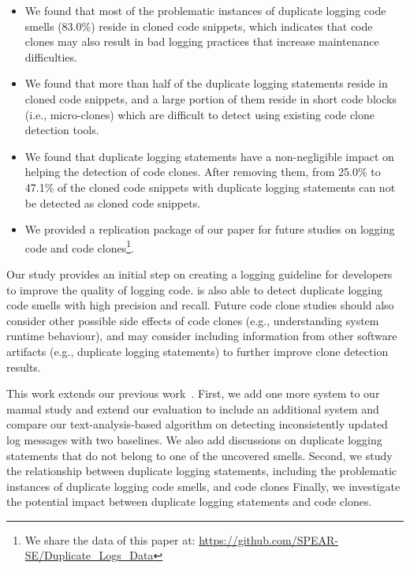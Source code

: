 \begin{itemize}
  \item We found that most of the problematic instances of duplicate logging code smells (83.0\%) reside in cloned code snippets, which indicates that code clones may also result in bad logging practices that increase maintenance difficulties.

  \item We found that more than half of the duplicate logging statements reside in cloned code snippets, and a large portion of them reside in short code blocks (i.e., micro-clones) which are difficult to detect using existing code clone detection tools.


  \item We found that duplicate logging statements have a non-negligible impact on helping the detection of code clones. After removing them, from 25.0\% to 47.1\% of the cloned code snippets with duplicate logging statements can not be detected as cloned code snippets. 

  \item We provided a replication package of our paper for future studies on logging code and code clones\footnote{We share the data of this paper at: \url{https://github.com/SPEAR-SE/Duplicate_Logs_Data}}.




\end{itemize}

Our study provides an initial step on creating a logging guideline for developers to improve the quality of logging code. \toolS is also able to detect duplicate logging code smells with high precision and recall. Future code clone studies should also consider other possible side effects of code clones (e.g., understanding system runtime behaviour), and may consider including information from other software artifacts (e.g., duplicate logging statements) to further improve clone detection results.


This work extends our previous work~\cite{DLFinder}. First, we add one more system to our manual study and extend our evaluation to include an additional system and compare our text-analysis-based algorithm on detecting inconsistently updated log messages with two baselines. We also add discussions on duplicate logging statements that do not belong to one of the uncovered smells.
Second, we study the relationship between duplicate logging statements, including the problematic instances of duplicate logging code smells, and code clones 
Finally, we investigate the potential impact between duplicate logging statements and code clones.

